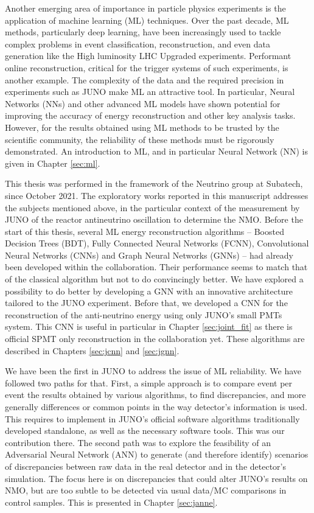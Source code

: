 \documentclass[../main.tex]{subfiles}
\begin{document}
\hfill

Another emerging area of importance in particle physics experiments is the application of machine learning (ML) techniques. Over the past decade, ML methods, particularly deep learning, have been increasingly used to tackle complex problems in event classification, reconstruction, and even data generation like the High luminosity LHC Upgraded experiments. Performant online reconstruction, critical for the trigger systems of such
 experiments, is another example. The complexity of the data and the required precision in experiments such as JUNO make ML an attractive tool. In particular, Neural Networks (NNs) and other advanced ML models have shown potential for improving the accuracy of energy reconstruction and other key analysis tasks. However, for the results obtained using ML methods to be trusted by the scientific community, the reliability of these methods must be rigorously demonstrated.
An introduction to ML, and in particular Neural Network (NN) is given in Chapter \ref{sec:ml}.

\hfill

This thesis was performed in the framework of the Neutrino group at Subatech, since October 2021. The exploratory works reported in this manuscript addresses the subjects mentioned above, in the particular context of the measurement by JUNO of the reactor antineutrino
oscillation to determine the NMO.
Before the start of this thesis, several ML energy reconstruction algorithms -- Boosted Decision Trees (BDT), Fully Connected Neural Networks (FCNN), Convolutional Neural Networks (CNNs) and Graph Neural Networks (GNNs) --  had already been developed within
the collaboration. Their performance seems to match that of the classical algorithm but not to do convincingly better. We have explored a possibility
to do better by developing a GNN with an innovative architecture tailored to the JUNO experiment. Before that, we developed a CNN for the reconstruction of the anti-neutrino
energy using only JUNO's small PMTs system.
This CNN is useful in particular in Chapter \ref{sec:joint_fit} as there is official SPMT only reconstruction in the collaboration yet. These algorithms are described in Chapters \ref{sec:jcnn} and \ref{sec:jgnn}.

We have been the first in JUNO to address the issue of ML reliability.
We have followed two paths for that.
First, a simple approach is to compare event per event the results obtained by various algorithms, to find discrepancies, and more generally differences or common points in the way detector's information is used.
This requires to implement in JUNO's official software algorithms traditionally developed standalone, as well as the necessary software tools. This was our contribution there.
The second path was to explore the feasibility of an Adversarial Neural Network (ANN) to generate (and therefore identify) scenarios of discrepancies
between raw data in the real detector and in the detector's simulation.
The focus here is on discrepancies that could alter JUNO's results on NMO, but are too subtle to be detected via usual data/MC comparisons in control samples.
This is presented in Chapter \ref{sec:janne}.
\end{document}
